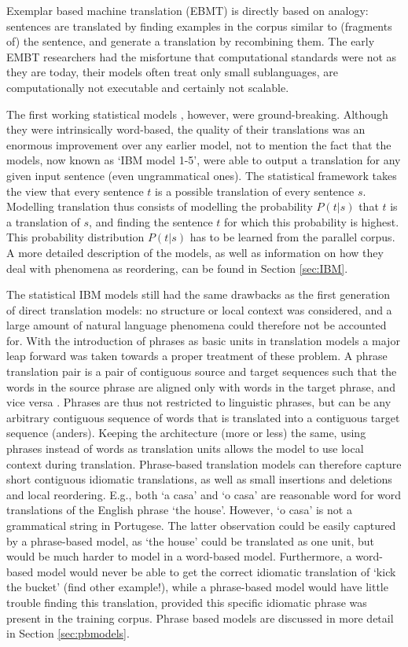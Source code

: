 \documentclass{report}
\theoremstyle{definition}
\theoremstyle{plain}
\begin{document}
Exemplar based machine translation (EBMT) is directly based on analogy: sentences are translated by finding examples in the corpus similar to (fragments of) the sentence, and generate a translation by recombining them. The early EMBT researchers had the misfortune that computational standards were not as they are today, their models often treat only small sublanguages, are computationally not executable and certainly not scalable. 

The first working statistical models \citep{brown1988statistical,brown1990statistical,brown1993mathematics}, however, were ground-breaking. Although they were intrinsically word-based, the quality of their translations was an enormous improvement over any earlier model, not to mention the fact that the models, now known as `IBM model 1-5', were able to output a translation for any given input sentence (even ungrammatical ones). The statistical framework takes the view that every sentence $t$ is a possible translation of every sentence $s$. Modelling translation thus consists of modelling the probability $P(t|s)$ that $t$ is a translation of $s$, and finding the sentence $t$ for which this probability is highest. This probability distribution $P(t|s)$ has to be learned from the parallel corpus. A more detailed description of the models, as well as information on how they deal with phenomena as reordering, can be found in Section \ref{sec:IBM}.

The statistical IBM models still had the same drawbacks as the first generation of direct translation models: no structure or local context was considered, and a large amount of natural language phenomena could therefore not be accounted for. With the introduction of phrases as basic units in translation models \citep{wang1998grammar,och1999improved} a major leap forward was taken towards a proper treatment of these problem. A phrase translation pair is a pair of contiguous source and target sequences such that the words in the source phrase are aligned only with words in the target phrase, and vice versa \citep{och2000improved}. Phrases are thus not restricted to linguistic phrases, but can be any arbitrary contiguous sequence of words that is translated into a contiguous target sequence (anders). Keeping the architecture (more or less) the same, using phrases instead of words as translation units allows the model to use local context during translation. Phrase-based translation models can therefore capture short contiguous idiomatic translations, as well as small insertions and deletions and local reordering. E.g., both `a casa' and `o casa' are reasonable word for word translations of the English phrase `the house'. However, `o casa' is not a grammatical string in Portugese. The latter observation could be easily captured by a phrase-based model, as `the house' could be translated as one unit, but would be much harder to model in a word-based model. Furthermore, a word-based model would never be able to get the correct idiomatic translation of `kick the bucket' (find other example!), while a phrase-based model would have little trouble finding this translation, provided this specific idiomatic phrase was present in the training corpus. Phrase based models are discussed in more detail in Section \ref{sec:pbmodels}.
\end{document}
